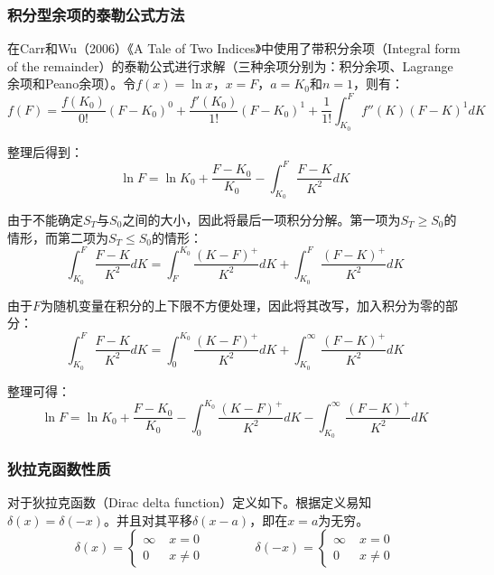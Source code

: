 \documentclass[11pt]{article}
\begin{document}
\subsubsection{积分型余项的泰勒公式方法}
在Carr和Wu（2006）《A Tale of Two Indices》中使用了带积分余项（Integral form of the remainder）的泰勒公式进行求解（三种余项分别为：积分余项、Lagrange余项和Peano余项）。令$f(x) = \ln x$，$x=F$，$a=K_0$和$n=1$，则有：
\begin{equation*}
    f(F) = \frac{f(K_0)}{0!}(F-K_0)^0 + \frac{f'(K_0)}{1!}(F-K_0)^1 + \frac{1}{1!} \int^{F}_{K_0} f''(K) (F - K)^1 dK
\end{equation*}

整理后得到：
\begin{equation*}
    \ln F = \ln K_0 + \frac{F - K_0}{K_0} - \int^{F}_{K_0} \frac{F-K}{K^2} dK
\end{equation*}

由于不能确定$S_T$与$S_0$之间的大小，因此将最后一项积分分解。第一项为$S_T \geq S_0$的情形，而第二项为$S_T \leq S_0$的情形：
\begin{equation*}
    \int^{F}_{K_0} \frac{F-K}{K^2} dK = \int^{K_0}_{F} \frac{(K-F)^+}{K^2} dK + \int^{F}_{K_0} \frac{(F-K)^+}{K^2} dK
\end{equation*}

由于$F$为随机变量在积分的上下限不方便处理，因此将其改写，加入积分为零的部分：
\begin{equation*}
    \int^{F}_{K_0} \frac{F-K}{K^2} dK = \int^{K_0}_{0} \frac{(K-F)^+}{K^2} dK + \int^{\infty}_{K_0} \frac{(F-K)^+}{K^2} dK 
\end{equation*}

整理可得：
\begin{equation*}
    \ln F = \ln K_0 + \frac{F-K_0}{K_0} - \int^{K_0}_{0} \frac{(K-F)^+}{K^2} dK - \int^{\infty}_{K_0} \frac{(F-K)^+}{K^2} dK 
\end{equation*}

\subsubsection{狄拉克\tops{$\delta$}函数性质}

对于狄拉克函数（Dirac delta function）定义如下。根据定义易知$\delta(x)=\delta(-x)$。并且对其平移$\delta(x-a)$，即在$x=a$为无穷。
\begin{equation*}
    \delta(x) =
    \begin{cases}
        \infty \;  &x=0 \\
        0 \; &x\neq 0
    \end{cases}
    \qquad\qquad
    \delta(-x) =
    \begin{cases}
        \infty \;  &x=0 \\
        0 \; &x\neq 0
    \end{cases}
\end{equation*}
\end{document}

